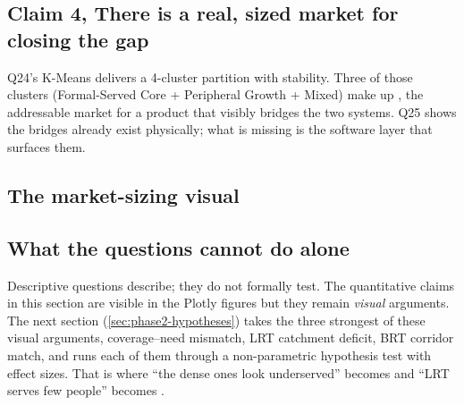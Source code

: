 \subsection*{Claim 4, There is a real, sized market for closing the gap}

Q24's K-Means delivers a 4-cluster partition with 
stability. Three of those clusters
(Formal-Served Core + Peripheral Growth + Mixed) make up
,
the addressable market for a product that visibly bridges the two
systems. Q25 shows the bridges already exist physically; what is
missing is the software layer that surfaces them.

\subsection*{The market-sizing visual}



\subsection*{What the questions cannot do alone}

Descriptive questions describe; they do not formally test. The
quantitative claims in this section are visible in the Plotly figures
but they remain \emph{visual} arguments. The next section
(\ref{sec:phase2-hypotheses}) takes the three strongest of these
visual arguments, coverage--need mismatch, LRT catchment deficit, BRT
corridor match, and runs each of them through a non-parametric
hypothesis test with effect sizes. That is where ``the dense ones
look underserved'' becomes  and ``LRT
serves few people'' becomes .
